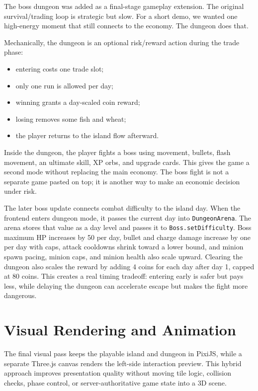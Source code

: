 \documentclass[11pt]{article}
\begin{document}
The boss dungeon was added as a final-stage gameplay extension. The original
survival/trading loop is strategic but slow. For a short demo, we wanted one
high-energy moment that still connects to the economy. The dungeon does that.

Mechanically, the dungeon is an optional risk/reward action during the trade
phase:

\begin{itemize}
  \item entering costs one trade slot;
  \item only one run is allowed per day;
  \item winning grants a day-scaled coin reward;
  \item losing removes some fish and wheat;
  \item the player returns to the island flow afterward.
\end{itemize}

Inside the dungeon, the player fights a boss using movement, bullets, flash
movement, an ultimate skill, XP orbs, and upgrade cards. This gives the game a
second mode without replacing the main economy. The boss fight is not a separate
game pasted on top; it is another way to make an economic decision under risk.

The later boss update connects combat difficulty to the island day. When the
frontend enters dungeon mode, it passes the current day into
\texttt{DungeonArena}. The arena stores that value as a day level and passes it
to \texttt{Boss.setDifficulty}. Boss maximum HP increases by 50 per day, bullet
and charge damage increase by one per day with caps, attack cooldowns shrink
toward a lower bound, and minion spawn pacing, minion caps, and minion health
also scale upward. Clearing the dungeon also scales the reward by adding 4 coins
for each day after day 1, capped at 80 coins. This creates a real timing
tradeoff: entering early is safer but pays less, while delaying the dungeon can
accelerate escape but makes the fight more dangerous.

\section{Visual Rendering and Animation}

The final visual pass keeps the playable island and dungeon in PixiJS, while a
separate Three.js canvas renders the left-side interaction preview. This hybrid
approach improves presentation quality without moving tile logic, collision
checks, phase control, or server-authoritative game state into a 3D scene.
\end{document}
